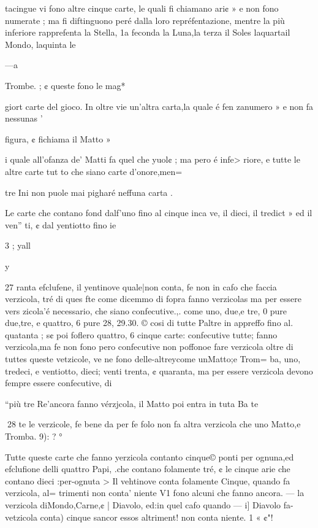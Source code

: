 \documentclass[11pt,a6paper]{article}
\begin{document}
 

 

tacingue vi fono altre cinque
carte, le quali fi chiamano ari¢ »
e non fono numerate ; ma fi diftinguono peré dalla loro repréfentazione, mentre la più inferiore rapprefenta la Stella, 1a
feconda la Luna,la terza il Soles
laquartail Mondo, laquinta le

 

—a

Trombe. ; ¢ queste fono le mag*

giort carte del gioco. In oltre
vie un’altra carta,la quale é fen
zanumero » e non fa nessunas '

figura, ¢ fichiama il Matto »

i quale all’ofanza de’ Matti fa
quel che yuol¢ ; ma pero é infe>
riore, e tutte le altre carte tut
to che siano carte d’onore,men=

tre Ini non puole mai pigharé
neffuna carta .

Le carte che contano fond
dalf’uno fino al cinque inca
ve, il dieci, il tredict » ed il ven”
ti, ¢ dal yentiotto fino ie

3 ; yall

y
 

27
ranta efclufene, il yentinove
quale|non conta, fe non in cafo
che faccia verzicola, tré di ques
fte come dicemmo di fopra fanno verzicolas ma per essere vers
zicola’é necessario, che siano
confecutive.,. come uno, due,e
tre, 0 pure due,tre, e quattro, 6
pure 28, 29.30. © cosi di tutte
Paltre in appreffo fino al. quatanta ; s¢ poi foflero quattro, 6
cinque carte: confecutive tutte;
fanno verzicola,ma fe non fono
pero confecutive non poffonoe
fare verzicola oltre di tuttes
queste vetzicole, ve ne fono delle-altreycome unMatto;e Trom=
ba, uno, tredeci, e ventiotto,
dieci; venti trenta, ¢ quaranta,
ma per essere verzicola devono
fempre essere confecutive, di

“più tre Re'ancora fanno vérzjcola, il Matto poi entra in tuta
Ba te

 
28
te le verzicole, fe bene da per fe
folo non fa altra verzicola che
uno Matto,e Tromba. 9): ? °

Tutte queste carte che fanno
yerzicola contanto cinque©
ponti per ognuna,ed efclufione
delli quattro Papi, .che contano
folamente tré, ¢ le cinque arie
che contano dieci :per-ognuta >
Il vehtinove conta folamente
Cinque, quando fa verzicola, al=
trimenti non conta’ niente V1
fono alcuni che fanno ancora. —
la verzicola diMondo,Carne,¢ |
Diavolo, ed:in quel cafo quando —
i] Diavolo fa-vetzicola conta)
cinque sancor essos altriment!
non conta niente. 1 « ¢"!
\end{document}

